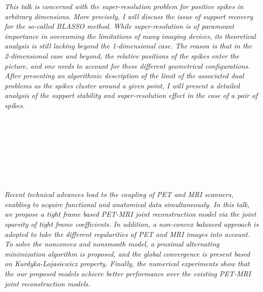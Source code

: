 \begin{multicols}{2}
        \\
        \\\\
        \\
        \\\\
        \\
        \\\\
\\
      \textit{This talk is concerned with the super-resolution problem for positive spikes in arbitrary dimensions. More precisely, I will discuss the issue of support recovery for the so-called BLASSO method. While super-resolution is of paramount importance in overcoming the limitations of many imaging devices, its theoretical analysis is still lacking beyond the 1-dimensional case. The reason is that in the 2-dimensional case and beyond, the relative positions of the spikes enter the picture, and one needs to account for these different geometrical configurations. After presenting an algorithmic description of the limit of the associated dual problems as the spikes cluster around a given point, I will present a detailed analysis of the support stability and super-resolution effect in the case of a pair of spikes.}\\
\\ 
        \\
        \\\\
        \\
        \\\\
\\
      \textit{Recent technical advances lead to the coupling of PET and MRI scanners, enabling to acquire functional and anatomical data simultaneously. In this talk, we propose a tight frame based PET-MRI joint reconstruction model via the joint sparsity of tight frame coefficients. In addition, a non-convex balanced approach is adopted to take the different regularities of PET and MRI images into account. To solve the nonconvex and nonsmooth model, a proximal alternating minimization algorithm is proposed, and the global convergence is present based on Kurdyka-Lojasiewicz property. Finally, the numerical experiments show that the our proposed models achieve better performance over the existing PET-MRI joint reconstruction models.}\\

\end{multicols}
